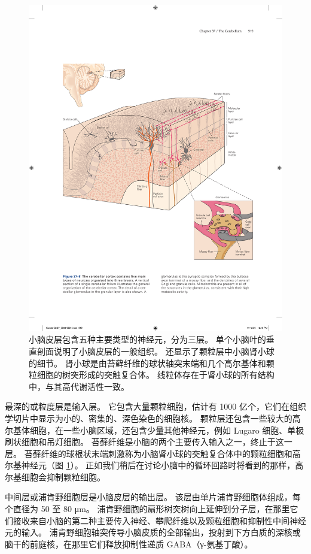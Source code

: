 \begin{figure}[htbp]
	\centering
	\includegraphics[width=0.9\linewidth]{chap37/fig_37_8}
	\caption{小脑皮层包含五种主要类型的神经元，分为三层。 单个小脑叶的垂直剖面说明了小脑皮层的一般组织。 还显示了颗粒层中小脑肾小球的细节。 肾小球是由苔藓纤维的球状轴突末端和几个高尔基体和颗粒细胞的树突形成的突触复合体。 线粒体存在于肾小球的所有结构中，与其高代谢活性一致。}
	\label{fig:37_8}
\end{figure}

最深的或粒度层是输入层。
它包含大量颗粒细胞，估计有 1000 亿个，它们在组织学切片中显示为小的、密集的、深色染色的细胞核。
颗粒层还包含一些较大的高尔基体细胞，在一些小脑区域，还包含少量其他神经元，例如 Lugaro 细胞、单极刷状细胞和吊灯细胞。
苔藓纤维是小脑的两个主要传入输入之一，终止于这一层。
苔藓纤维的球根状末端刺激称为小脑肾小球的突触复合体中的颗粒细胞和高尔基神经元（图 \ref{fig:37_8}）。
正如我们稍后在讨论小脑中的循环回路时将看到的那样，高尔基细胞会抑制颗粒细胞。


中间层或浦肯野细胞层是小脑皮层的输出层。
该层由单片浦肯野细胞体组成，每个直径为 50 至 80 μm。
浦肯野细胞的扇形树突树向上延伸到分子层，在那里它们接收来自小脑的第二种主要传入神经、攀爬纤维以及颗粒细胞和抑制性中间神经元的输入。
浦肯野细胞轴突传导小脑皮质的全部输出，投射到下方白质的深核或脑干的前庭核，在那里它们释放抑制性递质 GABA（γ-氨基丁酸）。


